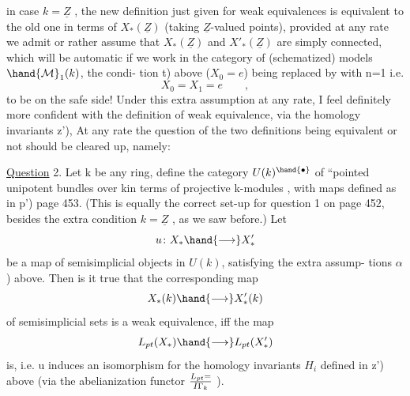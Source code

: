 
in case $k=\underline{Z}$ ,  the new definition just given for weak equivalences is
equivalent to the old one in terms of $X_*(\underline{Z})$  (taking $\underline{Z}$-valued points),
provided at any rate we admit  or rather assume that $X_*(\underline{Z})$ 
 and $X'_*(\underline{Z})$  are simply connected, \unsure{-}which will be automatic if
we work in the category of (schematized) models $\hand{\mathcal{M}}_1(k)$,   the condi-%
tion \hand{(}t) above  ($X_0 = e$)  being replaced by   with n=1  i.e. 
\margin{($\alpha$)}
\[ X_0 = X_1 = e \qquad , \]
to be on the safe side!  Under this extra assumption at any rate,  I feel
definitely more confident with the  definition of weak equivalence,
via the homology invariants \hand{(}z'),  At any rate the question of the two
definitions being equivalent or not should be cleared up,  namely:

\uline{Question} 2.   Let k be any ring,  define the category $U(k)^{\hand{\bullet}}$ of ``pointed
unipotent bundles over kin terms of projective k-modules ,  with maps
defined as in \hand{(}p')  page 453. (This is equally the correct set-up for
question 1 on page 452,  besides the extra condition $k=\underline{Z}$ , as we saw
before.)  Let
\[ u\colon X_* \hand{\longrightarrow} X'_* \]
be a map of semisimplicial objects in $U(k)$,  satisfying  the extra assump-%
tions \hand{(}$\alpha$) above.   Then is it true  that the corresponding map 
\margin{($\beta$)}
\[ X_*(k) \hand{\longrightarrow} X'_*(k) \]
of semisimplicial sets is a weak equivalence, iff  the map
\[ L_{pt}(X_*) \hand{\longrightarrow} L_{pt}(X'_*) \]
is,  i.e.  u induces an isomorphism for the homology invariants $H_i$
defined in \hand{(}z') above (via the abelianization functor  $L_{pt} = \over{I}{\Gamma}_k$ ).

